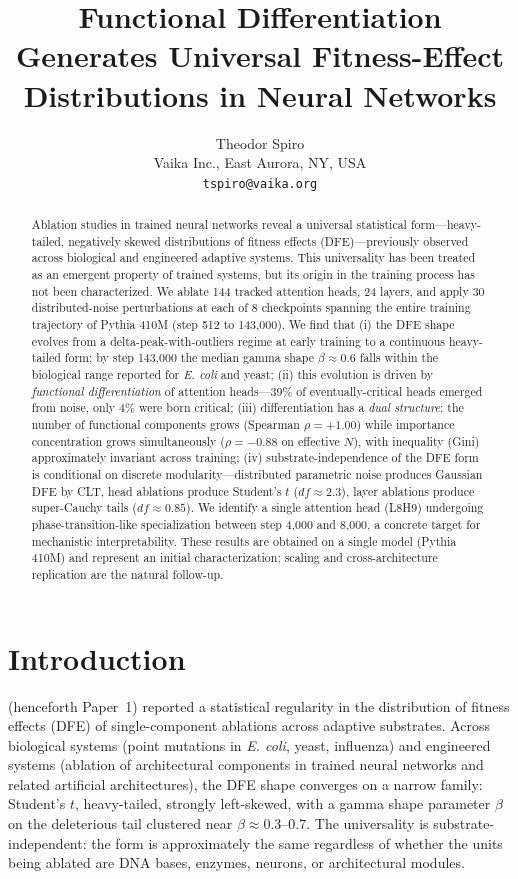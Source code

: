 \documentclass{article}
\title{Functional Differentiation Generates Universal Fitness-Effect Distributions in Neural Networks}
\author{%
  Theodor Spiro \\
  Vaika Inc., East Aurora, NY, USA \\
  \texttt{tspiro@vaika.org}
}
\begin{document}
\maketitle

\begin{abstract}
Ablation studies in trained neural networks reveal a universal statistical form---heavy-tailed, negatively skewed distributions of fitness effects (DFE)---previously observed across biological and engineered adaptive systems. This universality has been treated as an emergent property of trained systems, but its origin in the training process has not been characterized. We ablate 144 tracked attention heads, 24 layers, and apply 30 distributed-noise perturbations at each of 8 checkpoints spanning the entire training trajectory of Pythia 410M (step 512 to 143{,}000). We find that (i) the DFE shape evolves from a delta-peak-with-outliers regime at early training to a continuous heavy-tailed form; by step 143{,}000 the median gamma shape $\beta \approx 0.6$ falls within the biological range reported for \emph{E. coli} and yeast; (ii) this evolution is driven by \emph{functional differentiation} of attention heads---39\% of eventually-critical heads emerged from noise, only 4\% were born critical; (iii) differentiation has a \emph{dual structure}: the number of functional components grows (Spearman $\rho = +1.00$) while importance concentration grows simultaneously ($\rho = -0.88$ on effective $N$), with inequality (Gini) approximately invariant across training; (iv) substrate-independence of the DFE form is conditional on discrete modularity---distributed parametric noise produces Gaussian DFE by CLT, head ablations produce Student's $t$ ($df \approx 2.3$), layer ablations produce super-Cauchy tails ($df \approx 0.85$). We identify a single attention head (L8H9) undergoing phase-transition-like specialization between step 4{,}000 and 8{,}000, a concrete target for mechanistic interpretability. These results are obtained on a single model (Pythia 410M) and represent an initial characterization; scaling and cross-architecture replication are the natural follow-up.
\end{abstract}

\section{Introduction}
\label{sec:intro}

\citet{spiro2026universal} (henceforth Paper~1) reported a statistical regularity in the distribution of fitness effects (DFE) of single-component ablations across adaptive substrates. Across biological systems (point mutations in \emph{E. coli}, yeast, influenza) and engineered systems (ablation of architectural components in trained neural networks and related artificial architectures), the DFE shape converges on a narrow family: Student's $t$, heavy-tailed, strongly left-skewed, with a gamma shape parameter $\beta$ on the deleterious tail clustered near $\beta \approx 0.3$--$0.7$. The universality is substrate-independent: the form is approximately the same regardless of whether the units being ablated are DNA bases, enzymes, neurons, or architectural modules.
\end{document}
